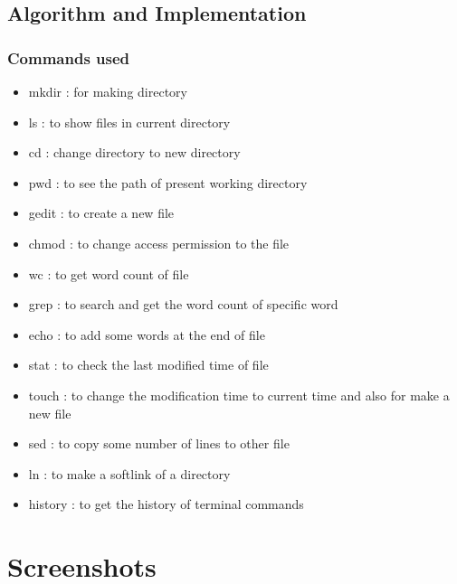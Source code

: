 \documentclass[12pt,a4paper]{article}
\begin{document}
		\subsection{Algorithm and Implementation~\cite{lc}}
		\subsubsection{Commands used }
			\begin{itemize}
				\item mkdir : for making directory
				\item ls : to show files in current directory
			    \item cd : change directory to new directory
			    \item pwd : to see the path of present working directory
			    \item gedit : to create a new file
			    \item chmod : to change access permission to the file
			    \item wc : to get word count of file
			    \item grep : to search and get the word count of specific word
			    \item echo : to add some words at the end of file
			    \item stat : to check the last modified time of file
			    \item touch : to change the modification time to current time and also for make a new file
			    \item sed : to copy some number of lines to other file
			    \item ln : to make a softlink of a directory
			    \item history : to get the history of terminal commands
			\end{itemize}
		
		
		
		\clearpage
		\section{Screenshots}
		
\end{document}
